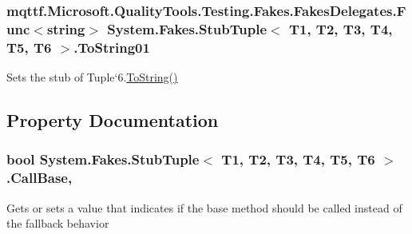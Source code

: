 \hypertarget{class_system_1_1_fakes_1_1_stub_tuple_3_01_t1_00_01_t2_00_01_t3_00_01_t4_00_01_t5_00_01_t6_01_4_ab5574a29256c69cdff893bedd424f1b6}{
\subsubsection[{To\-String01}]{\setlength{\rightskip}{0pt plus 5cm}mqttf.\-Microsoft.\-Quality\-Tools.\-Testing.\-Fakes.\-Fakes\-Delegates.\-Func$<$string$>$ System.\-Fakes.\-Stub\-Tuple$<$ T1, T2, T3, T4, T5, T6 $>$.To\-String01}}\label{class_system_1_1_fakes_1_1_stub_tuple_3_01_t1_00_01_t2_00_01_t3_00_01_t4_00_01_t5_00_01_t6_01_4_ab5574a29256c69cdff893bedd424f1b6}


Sets the stub of Tuple`6.\hyperlink{class_system_1_1_fakes_1_1_stub_tuple_3_01_t1_00_01_t2_00_01_t3_00_01_t4_00_01_t5_00_01_t6_01_4_a2be9c97e4cec3162c563bc878932fff0}{To\-String()}



\subsection{Property Documentation}
\hypertarget{class_system_1_1_fakes_1_1_stub_tuple_3_01_t1_00_01_t2_00_01_t3_00_01_t4_00_01_t5_00_01_t6_01_4_a109c8903d5fa55a85e466b14e2664bd6}{
\subsubsection[{Call\-Base}]{\setlength{\rightskip}{0pt plus 5cm}bool System.\-Fakes.\-Stub\-Tuple$<$ T1, T2, T3, T4, T5, T6 $>$.Call\-Base\hspace{0.3cm}{\ttfamily [get]}, {\ttfamily [set]}}}\label{class_system_1_1_fakes_1_1_stub_tuple_3_01_t1_00_01_t2_00_01_t3_00_01_t4_00_01_t5_00_01_t6_01_4_a109c8903d5fa55a85e466b14e2664bd6}


Gets or sets a value that indicates if the base method should be called instead of the fallback behavior

